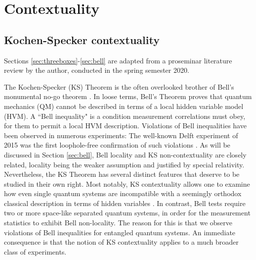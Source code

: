 \part{Contextuality}
\chapter{Kochen-Specker contextuality}
\label{sec:kscontextuality}
Sections \ref{sec:threeboxes}-\ref{sec:bell} are adapted from a proseminar literature review by the author, conducted in the spring semester 2020.

The Kochen-Specker (KS) Theorem \cite{Kochen1968} is the often overlooked brother of Bell's monumental no-go theorem \cite{Bell1964}. In loose terms, Bell's Theorem proves that quantum mechanics (QM) cannot be described in terms of a local hidden variable model (HVM). A ``Bell inequality" is a condition measurement correlations must obey, for them to permit a local HVM description. Violations of Bell inequalities have been observed in numerous experiments: The well-known Delft experiment of 2015 was the first loophole-free confirmation of such violations \cite{Hensen2015}. As will be discussed in Section \ref{sec:bell}, Bell locality and KS non-contextuality are closely related, locality being the weaker assumption and justified by special relativity. Nevertheless, the KS Theorem has several distinct features that deserve to be studied in their own right. Most notably, KS contextuality allows one to examine how even single quantum systems are incompatible with a seemingly orthodox classical description in terms of hidden variables \cite{Pusey2019}. In contrast, Bell tests require two or more space-like separated quantum systems, in order for the measurement statistics to exhibit Bell non-locality. The reason for this is that we observe violations of Bell inequalities for entangled quantum systems. An immediate consequence is that the notion of KS contextuality applies to a much broader class of experiments.

